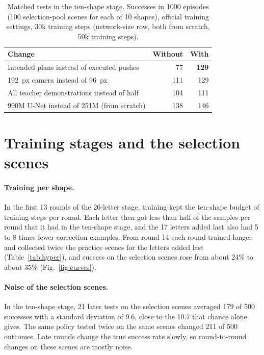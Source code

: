 \documentclass[10pt,twocolumn,letterpaper]{article}
\begin{document}
\begin{table}[!htbp]
  \centering\small
  \caption{Matched tests in the ten-shape stage. Successes in 1000 episodes (100 selection-pool scenes for each of 10
  shapes), official training settings, 30k training steps (network-size row, both from scratch, 50k training steps).}
  \label{tab:labels}
  \begin{tabular}{@{}lrr@{}}
    \toprule
    Change & Without & With \\
    \midrule
    Intended plans instead of executed pushes & 77 & \textbf{129} \\
    192~px camera instead of 96~px & 111 & 129 \\
    All teacher demonstrations instead of half & 104 & 111 \\
    990M U-Net instead of 251M (from scratch) & 138 & 146 \\
    \bottomrule
  \end{tabular}
\end{table}

\section{Training stages and the selection scenes}
\label{sec:app-stages}

\paragraph{Training per shape.}
In the first 13 rounds of the 26-letter stage, training kept the ten-shape budget of training steps per round.
Each letter then got less than half of the samples per round that it had in the ten-shape stage, and the 17 letters
added last also had 5 to 8 times fewer correction examples. From round 14 each round trained longer and collected
twice the practice scenes for the letters added last (Table~\ref{tab:hyper}), and success on the selection scenes rose
from about 24\% to about 35\% (Fig.~\ref{fig:curves}).

\paragraph{Noise of the selection scenes.}
In the ten-shape stage, 21 later tests on the selection scenes averaged 179 of 500 successes with a standard deviation
of 9.6, close to the 10.7 that chance alone gives. The same policy tested twice on the same scenes changed 211 of 500
outcomes. Late rounds change the true success rate slowly, so round-to-round changes on these scenes are mostly noise.
\end{document}

